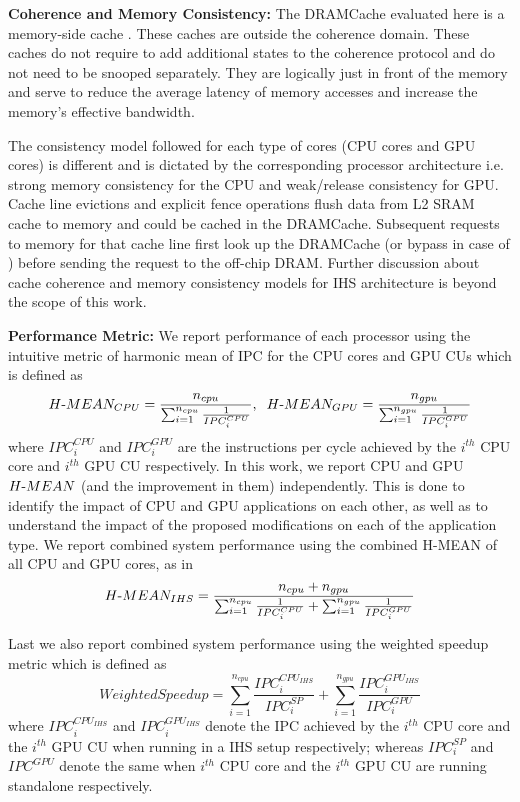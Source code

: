 \par \textbf{Coherence and Memory Consistency:} \label{discussion:coherence}
The DRAMCache evaluated here is a memory-side cache \cite{primer-coherence-consistency, mainak-hpca, skylake}.  These caches are outside the coherence domain. These caches do not require to add additional states to the coherence protocol and do not need to be snooped separately. They are logically just in front of the memory and serve to reduce the average latency of memory accesses and increase the memory's effective bandwidth.  
\par The consistency model followed for each type of cores (CPU cores and GPU cores) is different and is dictated by the corresponding processor architecture i.e. strong memory consistency for the CPU and weak/release consistency for GPU. Cache line evictions and explicit fence operations flush data from L2 SRAM cache to memory and could be cached in the DRAMCache. Subsequent requests to memory for that cache line first look up the DRAMCache (or bypass in case of \bypassname) before sending the request to the off-chip DRAM. Further discussion about cache coherence and memory consistency models for IHS architecture is beyond the scope of this work.

\par \textbf{Performance Metric:} We report performance of each processor using the intuitive metric of harmonic mean of IPC for the CPU cores and GPU CUs which is defined as 
{\small
\begin{equation*}
H\textnormal{-}MEAN_{CPU} = \frac{n_{cpu}}{\sum_{i=1}^{n_{cpu}} \frac{1}{IPC_{i}^{CPU}}}, \hspace{0.2cm} H\textnormal{-}MEAN_{GPU} = \frac{n_{gpu}}{\sum_{i=1}^{n_{gpu}} \frac{1}{IPC_{i}^{GPU}}} 
\end{equation*}
}
where $IPC_i^{CPU}$ and $IPC_i^{GPU}$ are the instructions per cycle achieved by the $i^{th}$ CPU core and $i^{th}$ GPU CU respectively.
In this work, we report CPU and GPU $H\textnormal{-}MEAN$ (and the improvement in them) independently. This is done to identify the impact of CPU and GPU applications on each other, as well as to understand the impact of the proposed modifications on each of the application type. We report combined system performance using the combined H-MEAN of all CPU and GPU cores, as in 
{\small
\begin{equation*}
H\textnormal{-}MEAN_{IHS} = \frac{n_{cpu}+ n_{gpu}}{\sum_{i=1}^{n_{cpu}} \frac{1}{IPC_{i}^{CPU}} + \sum_{i=1}^{n_{gpu}} \frac{1}{IPC_{i}^{GPU}}} 
\end{equation*}
}
\par Last we also report combined system performance using the weighted speedup metric \cite{weighted-speedup} which is defined as
{\small
\begin{equation*}
Weighted Speedup = \sum_{i=1}^{n_{cpu}} \frac{IPC_i^{CPU_{IHS}}}{IPC_i^{SP}} + \sum_{i=1}^{n_{gpu}} \frac{IPC_i^{GPU_{IHS}}}{IPC_i^{GPU}}
\end{equation*}
}
where ${IPC_i^{CPU_{IHS}}}$ and $IPC_i^{GPU_{IHS}}$ denote the IPC achieved by the $i^{th}$ CPU core and the $i^{th}$ GPU CU when running in a IHS setup respectively; whereas $IPC_i^{SP}$ and $IPC^{GPU}$ denote the same when $i^{th}$ CPU core and the $i^{th}$ GPU CU are running standalone respectively. 
